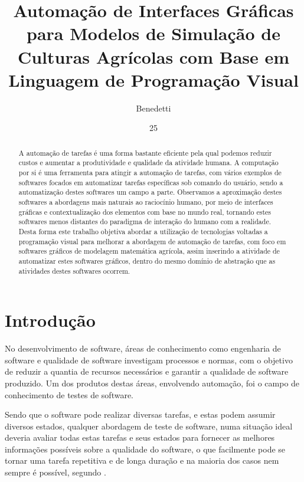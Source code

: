 \documentclass[tg]{mdtufsm}
\title{Automação de Interfaces Gráficas para Modelos de Simulação de Culturas Agrícolas com Base em Linguagem de Programação Visual}
\author{Benedetti}{Romulo Pulcinelli}
\institute{Centro de Tecnologia}
\date{25}{Maio}{2016}
\begin{document}
\maketitle
\makeapprove
	
\begin{abstract} 				 
	A automação de tarefas é uma forma bastante eficiente pela qual podemos reduzir custos e aumentar a produtividade e qualidade da atividade humana. A computação por si é uma ferramenta para atingir a automação de tarefas, com vários exemplos de softwares focados em automatizar tarefas específicas sob comando do usuário, sendo a automatização destes softwares um campo a parte. Observamos a aproximação destes softwares a abordagens mais naturais ao raciocínio humano, por meio de interfaces gráficas e contextualização dos elementos com base no mundo real, tornando estes softwares menos distantes do paradigma de interação do humano com a realidade. Desta forma este trabalho objetiva abordar a utilização de tecnologias voltadas a programação visual para melhorar a abordagem de automação de tarefas, com foco em softwares gráficos de modelagem matemática agrícola, assim inserindo a atividade de automatizar estes softwares gráficos, dentro do mesmo domínio de abstração que as atividades destes softwares ocorrem.
\end{abstract}		 

\tableofcontents

\setlength{\baselineskip}{1.5\baselineskip}

\chapter{Introdução}
	
	No desenvolvimento de software, áreas de conhecimento como engenharia de software e qualidade de software
investigam processos e normas, com o objetivo de reduzir a quantia de recursos necessários e garantir a qualidade de
software produzido. Um dos produtos destas áreas, envolvendo automação, foi o campo de conhecimento de testes de software.

Sendo que o software pode realizar diversas tarefas, e estas podem assumir diversos estados, qualquer abordagem
de teste de software, numa situação ideal deveria avaliar todas estas tarefas e seus estados para fornecer as melhores
informações possíveis sobre a qualidade do software, o que facilmente pode se tornar uma tarefa repetitiva e de longa
duração e na maioria dos casos nem sempre é possível, segundo \cite[pag. 10]{myers2011art}.
 
\end{document}
